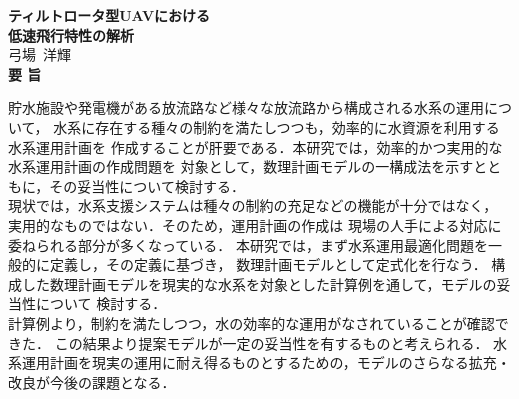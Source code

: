 \begin{titlepage}
\begin{center}
{\LARGE \bf ティルトロータ型UAVにおける\\低速飛行特性の解析}
\\[0.5cm]
{\Large 弓場~洋輝}
\\[1.0cm]
{\LARGE \bf 要\vspace{36pt}   旨\\}
\end{center}

\indent

貯水施設や発電機がある放流路など様々な放流路から構成される水系の運用について，%
水系に存在する種々の制約を満たしつつも，効率的に水資源を利用する水系運用計画を%
作成することが肝要である．本研究では，効率的かつ実用的な水系運用計画の作成問題を%
対象として，数理計画モデルの一構成法を示すとともに，その妥当性について検討する．
\\
\indent
現状では，水系支援システムは種々の制約の充足などの機能が十分ではなく，%
実用的なものではない．そのため，運用計画の作成は%
現場の人手による対応に委ねられる部分が多くなっている．
本研究では，まず水系運用最適化問題を一般的に定義し，その定義に基づき，%
数理計画モデルとして定式化を行なう．
構成した数理計画モデルを現実的な水系を対象とした計算例を通して，モデルの妥当性について%
検討する．
\\
\indent
計算例より，制約を満たしつつ，水の効率的な運用がなされていることが確認できた．
この結果より提案モデルが一定の妥当性を有するものと考えられる．
水系運用計画を現実の運用に耐え得るものとするための，モデルのさらなる拡充・改良が今後の課題となる．

\end{titlepage}
